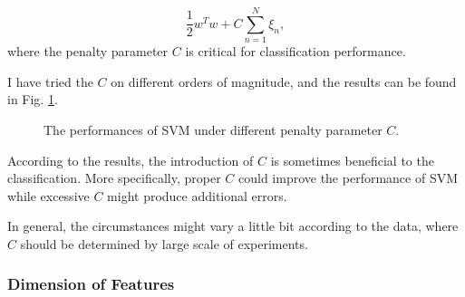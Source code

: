 \documentclass[12pt,a4paper]{article}
\theoremstyle{definition}
\begin{document}
\begin{equation*}
\dfrac{1}{2}w^Tw+C\sum\limits_{n=1}^{N}\xi_n,
\end{equation*}
where the penalty parameter $C$ is critical for classification performance. 

\vspace{0.01\linewidth}
I have tried the $C$ on different orders of magnitude, and the results can be found in Fig. \ref{fig:svm-penalty}.

\begin{figure}[H]
	\centering
	\caption{The performances of SVM under different penalty parameter $C$.}
	\label{fig:svm-penalty}
\end{figure}

According to the results, the introduction of $C$ is sometimes beneficial to the classification. More specifically, proper $C$ could improve the performance of SVM while excessive $C$ might produce additional errors.

\vspace{0.01\linewidth}
In general, the circumstances might vary a little bit according to the data, where $C$ should be determined by large scale of experiments.

\vspace{0.01\linewidth}
\subsubsection{Dimension of Features}
\label{sec:pca}
\end{document}
